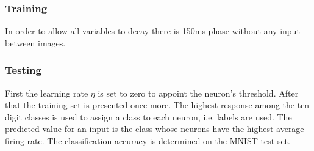 \subsubsection{Training}
In order to allow all variables to decay there is 150ms phase without any input between images.

\subsubsection{Testing}
First the learning rate $\eta$ is set to zero to appoint the neuron's threshold.
After that the training set is presented once more.
The highest response among the ten digit classes is used to assign a class to each neuron, i.e. labels are used.
The predicted value for an input is the class whose neurons have the highest average firing rate.
The classification accuracy is determined on the MNIST test set.